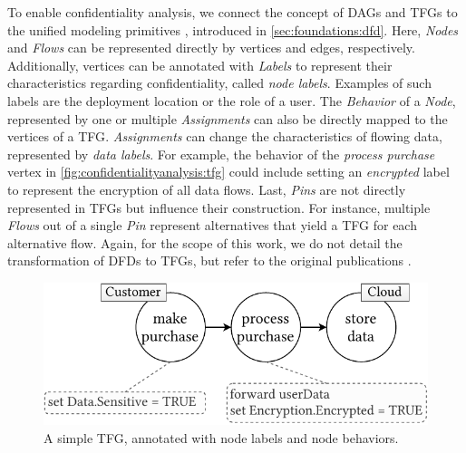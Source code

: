 
To enable confidentiality analysis, we connect the concept of \acp{DAG} and \acp{TFG} to the unified modeling primitives \cite{seifermann_unified_2021}, introduced in \autoref{sec:foundations:dfd}.
Here, \emph{Nodes} and \emph{Flows} can be represented directly by vertices and edges, respectively.
Additionally, vertices can be annotated with \emph{Labels} to represent their characteristics regarding confidentiality, called \emph{node labels}.
Examples of such labels are the deployment location or the role of a user.
The \emph{Behavior} of a \emph{Node}, represented by one or multiple \emph{Assignments} can also be directly mapped to the vertices of a \ac{TFG}.
\emph{Assignments} can change the characteristics of flowing data, represented by \emph{data labels}.
For example, the behavior of the \emph{process purchase} vertex in \autoref{fig:confidentialityanalysis:tfg} could include setting an \emph{encrypted} label to represent the encryption of all data flows.
Last, \emph{Pins} are not directly represented in \acp{TFG} but influence their construction.
For instance, multiple \emph{Flows} out of a single \emph{Pin} represent alternatives that yield a \ac{TFG} for each alternative flow.
Again, for the scope of this work, we do not detail the transformation of \acp{DFD} to \acp{TFG}, but refer to the original publications \cite{seifermann_detecting_2022,boltz_extensible_2024}.

\begin{figure}
    \centering
    \includegraphics[width=0.7\linewidth]{figures/chapter7/annotatedtfg.pdf}
    \caption{A simple \acf*{TFG}, annotated with node labels and node behaviors.}
    \label{fig:confidentialityanalysis:annotatedtfg}
\end{figure}

